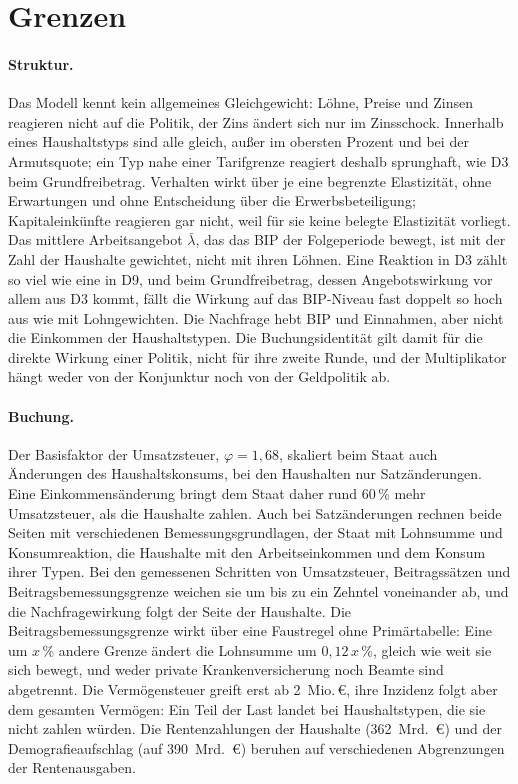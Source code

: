 
\section{Grenzen}
\label{sec:grenzen}

\paragraph{Struktur.} Das Modell kennt kein allgemeines Gleichgewicht: Löhne,
Preise und Zinsen reagieren nicht auf die Politik, der Zins ändert sich nur
im Zinsschock. Innerhalb eines Haushaltstyps sind alle gleich, außer im
obersten Prozent und bei der Armutsquote; ein Typ nahe einer Tarifgrenze
reagiert deshalb sprunghaft, wie D3 beim Grundfreibetrag. Verhalten wirkt über
je eine begrenzte Elastizität, ohne Erwartungen und ohne Entscheidung über die
Erwerbsbeteiligung; Kapitaleinkünfte reagieren gar nicht, weil für sie keine
belegte Elastizität vorliegt. Das mittlere Arbeitsangebot $\bar\lambda$, das
das BIP der Folgeperiode bewegt, ist mit der Zahl der Haushalte gewichtet, nicht
mit ihren Löhnen. Eine Reaktion in D3 zählt so viel wie eine in D9, und beim
Grundfreibetrag, dessen Angebotswirkung vor allem aus D3 kommt, fällt die
Wirkung auf das BIP-Niveau fast doppelt so hoch aus wie mit Lohngewichten. Die
Nachfrage hebt BIP und Einnahmen, aber nicht die
Einkommen der Haushaltstypen. Die Buchungsidentität gilt damit für die
direkte Wirkung einer Politik, nicht für ihre zweite Runde, und der
Multiplikator hängt weder von der Konjunktur noch von der Geldpolitik ab.

\paragraph{Buchung.} Der Basisfaktor der Umsatzsteuer, $\varphi = 1{,}68$,
skaliert beim Staat auch Änderungen des Haushaltskonsums, bei den Haushalten
nur Satzänderungen. Eine Einkommensänderung bringt dem Staat daher rund 60\,\%
mehr Umsatzsteuer, als die Haushalte zahlen. Auch bei Satzänderungen rechnen
beide Seiten mit verschiedenen Bemessungsgrundlagen, der Staat mit Lohnsumme und
Konsumreaktion, die Haushalte mit den Arbeitseinkommen und dem Konsum ihrer
Typen. Bei den gemessenen Schritten von Umsatzsteuer, Beitragssätzen und
Beitragsbemessungsgrenze weichen sie um bis zu ein Zehntel voneinander ab, und
die Nachfragewirkung folgt der Seite der Haushalte. Die Beitragsbemessungsgrenze
wirkt über eine Faustregel ohne Primärtabelle: Eine um $x$\,\% andere Grenze
ändert die Lohnsumme um $0{,}12\,x$\,\%, gleich wie weit sie sich bewegt, und
weder private Krankenversicherung noch Beamte sind abgetrennt. Die Vermögensteuer greift erst ab 2~Mio.\,\euro, ihre
Inzidenz folgt aber dem gesamten Vermögen: Ein Teil der Last landet bei
Haushaltstypen, die sie nicht zahlen würden. Die Rentenzahlungen der
Haushalte (362~Mrd.~\euro) und der Demografieaufschlag (auf 390~Mrd.~\euro)
beruhen auf verschiedenen Abgrenzungen der Rentenausgaben.

